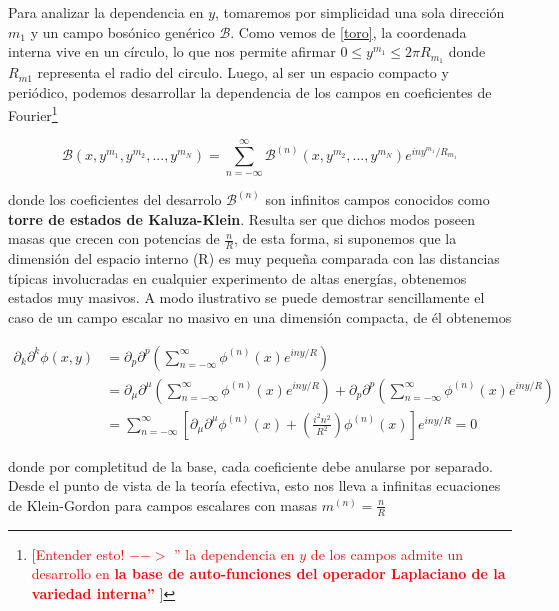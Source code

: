 \documentclass{article}
\numberwithin{equation}{section}
\begin{document}
Para analizar la dependencia en $ y $, tomaremos por simplicidad una sola dirección $ m_1 $ y un campo bosónico genérico $ \mathcal{B} $. Como vemos de \ref{toro}, la coordenada interna vive en un círculo, lo que nos permite afirmar $ 0\leq y^{m_1} \leq 2\pi R_{m_1}  $ donde $ R_{m1} $ representa el radio del circulo. Luego, al ser un espacio compacto y periódico, podemos desarrollar la dependencia de los campos en coeficientes de Fourier\footnote{[\textcolor{red}{Entender esto! $ --> $ '' la dependencia en $ y $ de los campos admite un desarrollo en \textbf{la base de auto-funciones del operador Laplaciano de la variedad interna''} }]}

\begin{equation}\label{fourier}
\mathcal{B} (x,y^{m_1},y^{m_2},...,y^{m_N}) = \sum_{n=-\infty}^{\infty} \mathcal{B}^{(n)}(x, y^{m_2},...,y^{m_N}) e^{i n y^{m_1}/ R_{m_1}}
\end{equation}

donde los coeficientes del desarrolo $ \mathcal{B}^{(n)} $ son infinitos campos conocidos como \textbf{torre de estados de Kaluza-Klein}. Resulta ser que dichos modos poseen masas que crecen con potencias de $ \frac{n}{R} $, de esta forma, si suponemos que la dimensión del espacio interno (R) es muy pequeña comparada con las distancias típicas involucradas en cualquier experimento de altas energías, obtenemos estados muy masivos. A modo ilustrativo se puede demostrar sencillamente el caso de un campo escalar no masivo en una dimensión compacta, de él obtenemos

\begin{equation}
\begin{aligned}
\partial_k \partial^k \phi (x,y) &= \partial_p \partial^p \left( \sum_{n=-\infty}^{\infty} \phi^{(n)}(x) e^{i n y / R} \right)\\
&= \partial_{\mu} \partial^{\mu}  \left( \sum_{n=-\infty}^{\infty} \phi^{(n)}(x) e^{i n y / R} \right) + \partial_p \partial^p  \left( \sum_{n=-\infty}^{\infty} \phi^{(n)}(x) e^{i n y / R} \right)\\
&= \sum_{n=-\infty}^{\infty} \left[ \partial_{\mu} \partial^{\mu} \phi^{(n)}(x) + \left(\frac{i^2 n^2}{R^2}\right) \phi^{(n)}(x) \right] e^{i n y / R} = 0
\end{aligned}
\end{equation}

donde por completitud de la base, cada coeficiente debe anularse por separado. Desde el punto de vista de la teoría efectiva, esto nos lleva a infinitas ecuaciones de Klein-Gordon para campos escalares con masas $ m^{(n)} = \frac{n}{R} $
\end{document}

